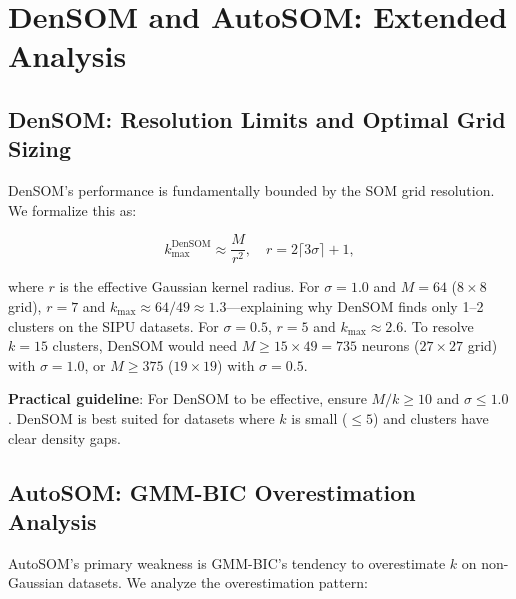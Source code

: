 \documentclass[journal]{IEEEtran}
\begin{document}
\section{DenSOM and AutoSOM: Extended Analysis}
\label{sec:densom_autosom}

\subsection{DenSOM: Resolution Limits and Optimal Grid Sizing}

DenSOM's performance is fundamentally bounded by the SOM grid resolution. We formalize this as:

\begin{equation}
  k_{\max}^{\text{DenSOM}} \approx \frac{M}{r^2}, \quad r = 2\lceil 3\sigma \rceil + 1,
\end{equation}

where $r$ is the effective Gaussian kernel radius. For $\sigma = 1.0$ and $M = 64$ ($8{\times}8$ grid), $r = 7$ and $k_{\max} \approx 64/49 \approx 1.3$---explaining why DenSOM finds only 1--2 clusters on the SIPU datasets. For $\sigma = 0.5$, $r = 5$ and $k_{\max} \approx 2.6$. To resolve $k = 15$ clusters, DenSOM would need $M \ge 15 \times 49 = 735$ neurons ($27{\times}27$ grid) with $\sigma = 1.0$, or $M \ge 375$ ($19{\times}19$) with $\sigma = 0.5$.

\textbf{Practical guideline}: For DenSOM to be effective, ensure $M/k \ge 10$ and $\sigma \le 1.0$. DenSOM is best suited for datasets where $k$ is small ($\le 5$) and clusters have clear density gaps.

\subsection{AutoSOM: GMM-BIC Overestimation Analysis}

AutoSOM's primary weakness is GMM-BIC's tendency to overestimate $k$ on non-Gaussian datasets. We analyze the overestimation pattern:
\end{document}
